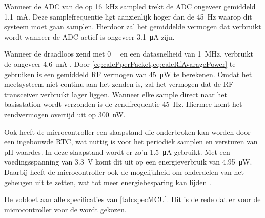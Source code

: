 Wanneer de ADC van de \mcu op \qty{16}{\kilo\hertz} sampled trekt de ADC ongeveer gemiddeld \qty{1.1}{\milli\ampere}. Deze samplefrequentie ligt aanzienlijk hoger dan de \qty{45}{\hertz} waarop dit systeem moet gaan samplen. Hierdoor zal het gemiddelde vermogen dat verbruikt wordt wanneer de ADC actief is ongeveer \qty{3.1}{\micro\ampere} zijn.

Wanneer de \mcu draadloos zend met \qty{0}{\deci\belmilliwatt} en een datasnelheid van \qty{1}{\mega\hertz}, verbruikt de \mcu ongeveer \qty{4.6}{\milli\ampere} \cite{nrf52810}. Door \cref{eq:calcPperPacket,eq:calcRfAvaragePower} te gebruiken is een gemiddeld RF vermogen van \qty{45}{\micro\watt} te berekenen. Omdat het \si{\pH} meetsysteem niet continu aan het zenden is, zal het vermogen dat de RF transceiver verbruikt lager liggen. Wanneer elke sample direct naar het basisstation wordt verzonden is de zendfrequentie \qty{45}{\hertz}. Hiermee komt het zendvermogen overtijd uit op \qty{300}{\nano\watt}.

Ook heeft de microcontroller een slaapstand die onderbroken kan worden door een ingebouwde RTC, wat nuttig is voor het periodiek samplen en versturen van pH-waardes. In deze slaapstand wordt er zo'n \qty{1.5}{\micro\ampere} gebruikt. Met een voedingsspanning van \qty{3.3}{\volt} komt dit uit op een energieverbruik van \qty{4.95}{\micro\watt}. Daarbij heeft de microcontroller ook de mogelijkheid om onderdelen van het geheugen uit te zetten, wat tot meer energiebesparing kan lijden \cite{nrf52810}.

De \mcu voldoet aan alle specificaties van \cref{tab:specMCU}. Dit is de rede dat er voor de microcontroller voor de \mcu wordt gekozen.
